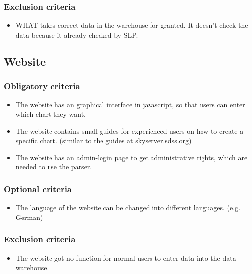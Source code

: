 \subsubsection{Exclusion criteria}
\begin{itemize}
\item WHAT takes correct data in the warehouse for granted. It doesn't check the
 data because it already checked by SLP. 
\end{itemize}


\subsection{Website}
\subsubsection{Obligatory criteria}
\begin{itemize}
\item The website has an graphical interface in javascript, so that users can enter which chart they want.
\item The website contains small guides for experienced users on how to create a specific chart. 
(similar to the guides at skyserver.sdss.org)
\item The website has an admin-login page to get administrative rights, which are needed to use the parser.
\end{itemize}

\subsubsection{Optional criteria}
\begin{itemize}
\item The language of the website can be changed into different languages. (e.g. German)
\end{itemize}

\subsubsection{Exclusion criteria}
\begin{itemize}
\item The website got no function for normal users to enter data into the data warehouse.
\end{itemize}

